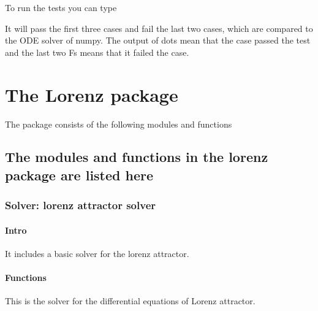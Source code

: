 \documentclass[letterpaper,10pt,english]{sphinxmanual}
\begin{document}
To run the tests you can type

\begin{sphinxVerbatim}[commandchars=\\\{\}]
 
\end{sphinxVerbatim}

It will pass the first three cases and fail the last two cases, which are compared to the ODE solver of numpy. The output of dots mean that the case passed the test and the last two Fs means that it failed the case.


\chapter{The Lorenz package}
\label{\detokenize{index:the-lorenz-package}}
The package consists of the following modules and functions


\section{The modules and functions in the lorenz package are listed here}
\label{\detokenize{Functions::doc}}\label{\detokenize{Functions:the-modules-and-functions-in-the-lorenz-package-are-listed-here}}

\subsection{Solver: lorenz attractor solver}
\label{\detokenize{Functions:solver-lorenz-attractor-solver}}

\subsubsection{Intro}
\label{\detokenize{Functions:intro}}
It includes a basic solver for the lorenz attractor.


\subsubsection{Functions}
\label{\detokenize{Functions:functions}}\label{\detokenize{Functions:module-lorenz.solver}}
This is the solver for the differential equations of Lorenz attractor.
\end{document}
